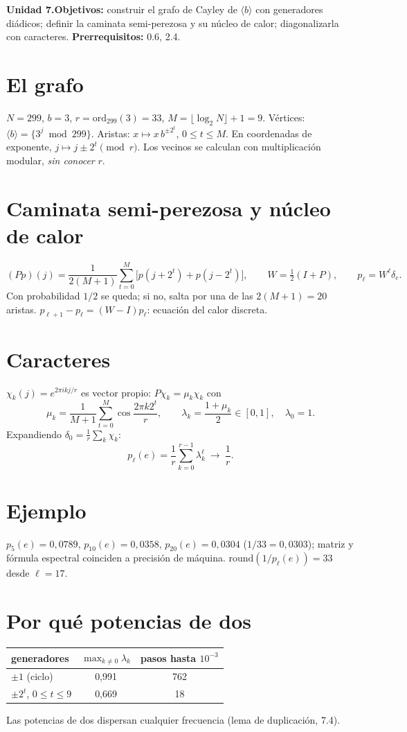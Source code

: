 \documentclass[11pt,a4paper]{article}
\begin{document}

\noindent\textbf{Unidad 7.}\quad\textbf{Objetivos:} construir el grafo de Cayley de $\langle b\rangle$ con generadores diádicos; definir la caminata
semi-perezosa y su núcleo de calor; diagonalizarla con caracteres.
\textbf{Prerrequisitos:} 0.6, 2.4.

\section{El grafo}
$N=299$, $b=3$, $r=\mathrm{ord}_{299}(3)=33$, $M=\lfloor\log_2N\rfloor+1=9$. Vértices: $\langle b\rangle=\{3^j\bmod299\}$. Aristas: $x\mapsto x\,b^{\pm2^t}$,
$0\le t\le M$. En coordenadas de exponente, $j\mapsto j\pm2^t\pmod{r}$. Los vecinos se calculan con multiplicación modular, \emph{sin conocer} $r$.

\section{Caminata semi-perezosa y núcleo de calor}
\[(Pp)(j)=\frac1{2(M+1)}\sum_{t=0}^M\big[p(j+2^t)+p(j-2^t)\big],\qquad W=\tfrac12(I+P),\qquad p_\ell=W^\ell\delta_e.\]
Con probabilidad $1/2$ se queda; si no, salta por una de las $2(M+1)=20$ aristas. $p_{\ell+1}-p_\ell=(W-I)p_\ell$: ecuación del calor discreta.

\section{Caracteres}
$\chi_k(j)=e^{2\pi ikj/r}$ es vector propio: $P\chi_k=\mu_k\chi_k$ con
\[\mu_k=\frac1{M+1}\sum_{t=0}^M\cos\frac{2\pi k2^t}r,\qquad\lambda_k=\frac{1+\mu_k}2\in[0,1],\quad\lambda_0=1.\]
Expandiendo $\delta_0=\frac1r\sum_k\chi_k$:
\[p_\ell(e)=\frac1r\sum_{k=0}^{r-1}\lambda_k^\ell\ \longrightarrow\ \frac1r.\]

\section{Ejemplo \evS}
$p_5(e)=0{,}0789$, $p_{10}(e)=0{,}0358$, $p_{20}(e)=0{,}0304$ ($1/33=0{,}0303$); matriz y fórmula espectral coinciden a precisión de máquina.
$\mathrm{round}(1/p_\ell(e))=33$ desde $\ell=17$.

\section{Por qué potencias de dos}
\begin{center}\begin{tabular}{lcc}\toprule
generadores & $\max_{k\ne0}\lambda_k$ & pasos hasta $10^{-3}$\\\midrule
$\pm1$ (ciclo) & 0,991 & 762\\
$\pm2^t$, $0\le t\le9$ & 0,669 & 18\\\bottomrule\end{tabular}\end{center}
Las potencias de dos dispersan cualquier frecuencia (lema de duplicación, 7.4).
\end{document}

